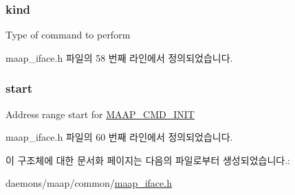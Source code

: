 \subsubsection[{\texorpdfstring{kind}{kind}}]{ kind}\hypertarget{struct_maap___cmd_adf329e36449de220d4316603214476d4}{}\label{struct_maap___cmd_adf329e36449de220d4316603214476d4}
Type of command to perform 

maap\+\_\+iface.\+h 파일의 58 번째 라인에서 정의되었습니다.

\subsubsection[{\texorpdfstring{start}{start}}]{ start}\hypertarget{struct_maap___cmd_a6a51e9baeec9b06ae477cf6475efc71d}{}\label{struct_maap___cmd_a6a51e9baeec9b06ae477cf6475efc71d}
Address range start for \hyperlink{maap__iface_8h_aaf90b1858e10440f7628ac5030e09a5ca25d975d65a26a7a6c06aeadc2b050851}{M\+A\+A\+P\+\_\+\+C\+M\+D\+\_\+\+I\+N\+IT} 

maap\+\_\+iface.\+h 파일의 60 번째 라인에서 정의되었습니다.



이 구조체에 대한 문서화 페이지는 다음의 파일로부터 생성되었습니다.\+:\begin{DoxyCompactItemize}
\item 
daemons/maap/common/\hyperlink{maap__iface_8h}{maap\+\_\+iface.\+h}\end{DoxyCompactItemize}
